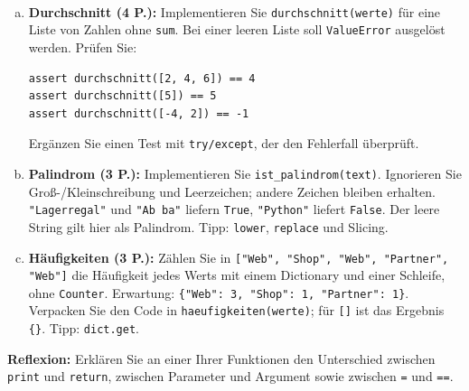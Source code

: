 \\
\begin{enumerate}[a)]
\item \textbf{Durchschnitt (4 P.):} Implementieren Sie \texttt{durchschnitt(werte)} für eine
Liste von Zahlen ohne \texttt{sum}. Bei einer leeren Liste soll \texttt{ValueError}
ausgelöst werden. Prüfen Sie:
\begin{lstlisting}
assert durchschnitt([2, 4, 6]) == 4
assert durchschnitt([5]) == 5
assert durchschnitt([-4, 2]) == -1
\end{lstlisting}
Ergänzen Sie einen Test mit \texttt{try/except}, der den Fehlerfall überprüft.
\item \textbf{Palindrom (3 P.):} Implementieren Sie \texttt{ist\_palindrom(text)}.
Ignorieren Sie Groß-/Kleinschreibung und Leerzeichen; andere Zeichen bleiben erhalten.
\texttt{"Lagerregal"} und \texttt{"Ab ba"} liefern \texttt{True}, \texttt{"Python"}
liefert \texttt{False}. Der leere String gilt hier als Palindrom.
Tipp: \texttt{lower}, \texttt{replace} und Slicing.
\item \textbf{Häufigkeiten (3 P.):} Zählen Sie in
\texttt{["Web", "Shop", "Web", "Partner", "Web"]} die Häufigkeit jedes Werts
mit einem Dictionary und einer Schleife, ohne \texttt{Counter}.
Erwartung: \texttt{\{"Web": 3, "Shop": 1, "Partner": 1\}}.
Verpacken Sie den Code in \texttt{haeufigkeiten(werte)}; für \texttt{[]} ist das Ergebnis
\texttt{\{\}}. Tipp: \texttt{dict.get}.
\end{enumerate}
\textbf{Reflexion:} Erklären Sie an einer Ihrer Funktionen den Unterschied zwischen
\texttt{print} und \texttt{return}, zwischen Parameter und Argument sowie zwischen
\texttt{=} und \texttt{==}.

